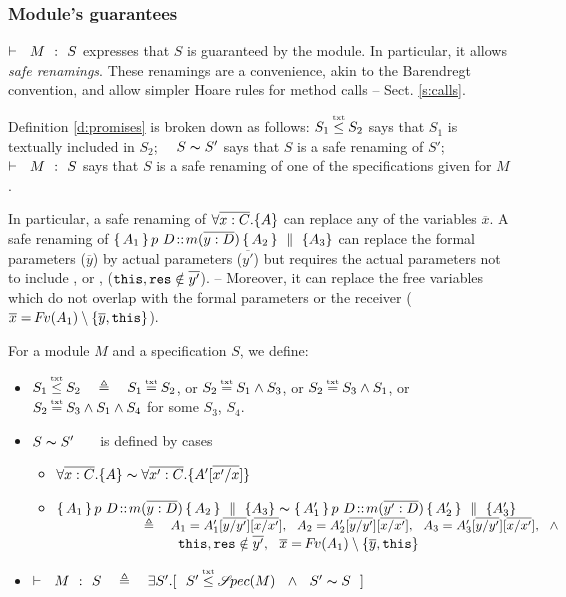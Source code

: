 \subsubsection{Module's guarantees}  %
  ${\vdash \ \ M\ \ \mathbf{:}\ \ S}$ expresses that $S$ is guaranteed by the module. In particular, it allows   \emph{safe  renamings}. These renamings are   a convenience, akin to the Barendregt convention, and  allow simpler Hoare rules for  method calls -- \cf Sect. \ref{s:calls}.

Definition \ref{d:promises} is broken down as follows:  $S_1 \txtin  S_2$ says that $S_1$ is textually included in $S_2$; \ \ $S \thicksim S'$ says that $S$ is a safe renaming of $S'$; \ \   ${\vdash \ \ M\ \ \mathbf{:}\ \ S}$ says that $S$ is a safe renaming of one of the specifications given for $M$. 
 
In particular, a safe renaming of  ${ \forall {\overline {x:C}}.{{\{}}{A}{{\}}}  }$ can replace any of the variables $\overline x$.  
A safe renaming  of ${\mprepostN{A_1}{p\ D}{m}{y}{D}{A_2} {A_3}}$  can replace  the formal parameters ($\overline y$) by actual parameters  ($\overline {y'}$) but requires the actual parameters  not to include , or , (\ie $\mbox{\normalfont{\texttt{this}}}, \mbox{\normalfont{\texttt{res}}}\notin \overline{y'}$). -- %
Moreover, it can replace  the free variables which do not overlap with the formal parameters or the receiver ( $\overline{x}={\hspace{-1pt}F\hspace{-1pt}}v(A_1)\setminus\{{\overline y},\mbox{\normalfont{\texttt{this}}}\}$).

\begin{definition}
For a module $M$ and a specification $S$, we define:
\label{d:promises}
\begin{itemize}
\item
$S_1 \txtin  S_2  \ \ \ \triangleq\ \ \   S_1 \txteq  S_2$, or  $S_2 \txteq  S_1 \wedge S_3$, or $S_2\txteq S_3 \wedge S_1$,  or   $S_2 \txteq S_3 \wedge  S_1 \wedge S_4$ for some $S_3$, $S_4$.
\item
$S  \thicksim  S'$ \ \ \  is defined by cases

\begin{itemize}
\item
$ { \forall {\overline {x:C}}.{{\{}}{A}{{\}}}  }   \thicksim  { \ensuremath{\forall {\overline {x':C}}.{{\{}}{A'[\overline{x'/x}]}{{\}}}} } $
\item
$ { \{\, A_1\, \}\, p\ D\!::\!m(\overline{y:D})\, \{\, A_2\, \} \, \,\parallel\,\, \{ A_3 \}}  \thicksim
 {\ensuremath{ \{\, A_1'\, \}\, p\ D\!::\!m(\overline{y':D})\, \{\, A_2'\, \} }\, \,\parallel\,\, \{A_3' \}} $
  \\
 $\strut \hspace{2cm}    \ \  \triangleq\ \ \  A_1 = A_1'[\overline{y/y'}][\overline{x/x'}], \ \ A_2 = A_2'[\overline{y/y'}][\overline{x/x'}], \ \ A_3 = A_3'[\overline{y/y'}][\overline{x/x'}], \ \ \wedge$\\
 $\strut \hspace{2cm}\ \ \ \ \ \ \ \ \ \prg{this}, \prg{res}\notin \overline{y'}, \ \ \overline{x}=\fv(A_1)\setminus\{{\overline y},\prg{this} \} $
  \end{itemize} 
  
 \item  
 $\promises M  S \ \ \ \triangleq
 \ \ \ \exists S'.[ \ \ S'  \txtin \SpecOf M\ \ \wedge\ \ S' \thicksim S \ \ ]$
  \end{itemize} 
  \end{definition} 
  
